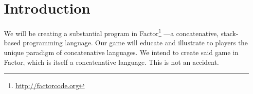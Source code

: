 \documentclass{sig-alternate}
\begin{document}



\section{Introduction}
We will be creating a substantial program in Factor\footnote{ \url{http://factorcode.org}} ---a concatenative, stack-based
programming language. 
Our game will educate and illustrate to players the
unique paradigm of concatenative languages. We intend to create
said game in Factor, which is itself a concatenative language.
This is not an accident. 
\end{document}
